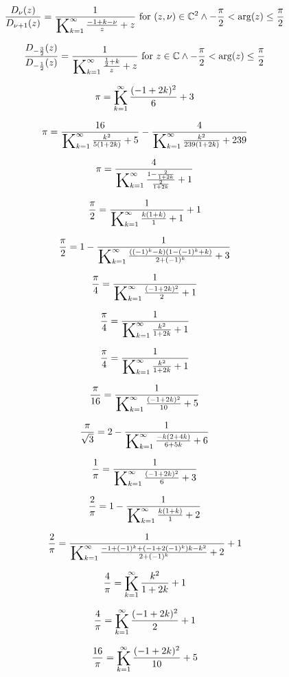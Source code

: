 \documentclass{article}
\newcommand{\bigK}{\mathop{\raisebox{-5pt}{\huge K}}}
\begin{document}
\[\frac{D_{\nu }(z)}{D_{\nu +1}(z)}=\frac{1}{\bigK_{k=1}^{\infty}\frac{-1+k-\nu }{z}+z}\text{ for }(z,\nu )\in \mathbb{C}^2\land -\frac{\pi }{2}<\arg (z)\leq \frac{\pi }{2}\] 

\[\frac{D_{-\frac{3}{2}}(z)}{D_{-\frac{1}{2}}(z)}=\frac{1}{\bigK_{k=1}^{\infty}\frac{\frac{1}{2}+k}{z}+z}\text{ for }z\in \mathbb{C}\land -\frac{\pi }{2}<\arg (z)\leq \frac{\pi }{2}\] 

\[\pi =\bigK_{k=1}^{\infty}\frac{(-1+2 k)^2}{6}+3\] 

\[\pi =\frac{16}{\bigK_{k=1}^{\infty}\frac{k^2}{5 (1+2 k)}+5}-\frac{4}{\bigK_{k=1}^{\infty}\frac{k^2}{239 (1+2 k)}+239}\] 

\[\pi =\frac{4}{\bigK_{k=1}^{\infty}\frac{1-\frac{2}{1+2 k}}{\frac{2}{1+2 k}}+1}\] 

\[\frac{\pi }{2}=\frac{1}{\bigK_{k=1}^{\infty}\frac{k (1+k)}{1}+1}+1\] 

\[\frac{\pi }{2}=1-\frac{1}{\bigK_{k=1}^{\infty}\frac{\left((-1)^k-k\right) \left(1-(-1)^k+k\right)}{2+(-1)^k}+3}\] 

\[\frac{\pi }{4}=\frac{1}{\bigK_{k=1}^{\infty}\frac{(-1+2 k)^2}{2}+1}\] 

\[\frac{\pi }{4}=\frac{1}{\bigK_{k=1}^{\infty}\frac{k^2}{1+2 k}+1}\] 

\[\frac{\pi }{4}=\frac{1}{\bigK_{k=1}^{\infty}\frac{k^2}{1+2 k}+1}\] 

\[\frac{\pi }{16}=\frac{1}{\bigK_{k=1}^{\infty}\frac{(-1+2 k)^2}{10}+5}\] 

\[\frac{\pi }{\sqrt{3}}=2-\frac{1}{\bigK_{k=1}^{\infty}\frac{-k (2+4 k)}{6+5 k}+6}\] 

\[\frac{1}{\pi }=\frac{1}{\bigK_{k=1}^{\infty}\frac{(-1+2 k)^2}{6}+3}\] 

\[\frac{2}{\pi }=1-\frac{1}{\bigK_{k=1}^{\infty}\frac{k (1+k)}{1}+2}\] 

\[\frac{2}{\pi }=\frac{1}{\bigK_{k=1}^{\infty}\frac{-1+(-1)^k+\left(-1+2 (-1)^k\right) k-k^2}{2+(-1)^k}+2}+1\] 

\[\frac{4}{\pi }=\bigK_{k=1}^{\infty}\frac{k^2}{1+2 k}+1\] 

\[\frac{4}{\pi }=\bigK_{k=1}^{\infty}\frac{(-1+2 k)^2}{2}+1\] 

\[\frac{16}{\pi }=\bigK_{k=1}^{\infty}\frac{(-1+2 k)^2}{10}+5\] 
\end{document}
